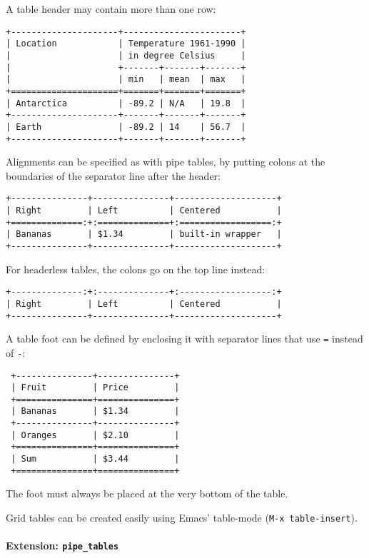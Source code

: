 \documentclass[
  a4paper,
]{article}
\begin{document}
A table header may contain more than one row:

\begin{verbatim}
+---------------------+-----------------------+
| Location            | Temperature 1961-1990 |
|                     | in degree Celsius     |
|                     +-------+-------+-------+
|                     | min   | mean  | max   |
+=====================+=======+=======+=======+
| Antarctica          | -89.2 | N/A   | 19.8  |
+---------------------+-------+-------+-------+
| Earth               | -89.2 | 14    | 56.7  |
+---------------------+-------+-------+-------+
\end{verbatim}

Alignments can be specified as with pipe tables, by putting colons at
the boundaries of the separator line after the header:

\begin{verbatim}
+---------------+---------------+--------------------+
| Right         | Left          | Centered           |
+==============:+:==============+:==================:+
| Bananas       | $1.34         | built-in wrapper   |
+---------------+---------------+--------------------+
\end{verbatim}

For headerless tables, the colons go on the top line instead:

\begin{verbatim}
+--------------:+:--------------+:------------------:+
| Right         | Left          | Centered           |
+---------------+---------------+--------------------+
\end{verbatim}

A table foot can be defined by enclosing it with separator lines that
use \texttt{=} instead of \texttt{-}:

\begin{verbatim}
 +---------------+---------------+
 | Fruit         | Price         |
 +===============+===============+
 | Bananas       | $1.34         |
 +---------------+---------------+
 | Oranges       | $2.10         |
 +===============+===============+
 | Sum           | $3.44         |
 +===============+===============+
\end{verbatim}

The foot must always be placed at the very bottom of the table.

Grid tables can be created easily using Emacs' table-mode
(\texttt{M-x\ table-insert}).

\hypertarget{extension-pipe_tables}{%
\paragraph{\texorpdfstring{Extension:
\texttt{pipe\_tables}}{Extension: pipe\_tables}}\label{extension-pipe_tables}}
\end{document}
